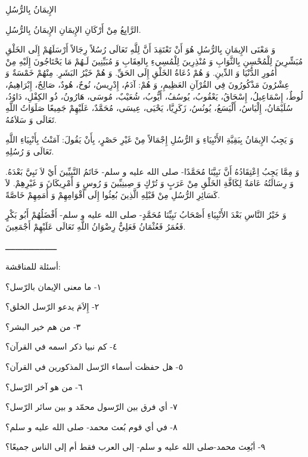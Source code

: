 \documentclass[a5paper]{article}
\begin{document}
الإِيمَانُ بِالرُّسُلِ

الرَّابِعُ مِنْ أَرْكَانِ الإِيمَانِ الإِيمَانُ بِالرُّسُلِ.

وَ مَعْنَى الإِيمَانِ بِالرُّسُلِ هُوَ أَنْ تَعْتَقِدَ أَنَّ لِلَّهِ تَعَالَى رُسُلاً رِجَالاً أَرْسَلَهُمْ إِلَى الخَلْقِ مُبَشِّرِينَ لِلْمُحْسِنِ بِالثَّوَابِ وَ مُنْذِرِينَ لِلْمُسِيءِ بِالعِقَابِ وَ مُبَيِّنِينَ لَـهُمْ مَا يَحْتَاجُونَ إِلَيْهِ مِنْ أُمُورِ الدُّنْيَا وَ الدِّينِ. وَ هُمْ دُعَاةُ الخَلْقِ إِلَى الحَقِّ. وَ هُمْ خَيْرُ البَشَرِ. مِنْهُمْ خَمْسَةٌ وَ عِشْرُونَ مَذْكُورُونَ فِي القُرْآنِ العَظِيمِ، وَ هُمْ: آدَمُ، إِدْرِيسُ، نُوحٌ، هُودٌ، صَالِحٌ، إِبْرَاهِيمُ، لُوطٌ، إِسْمَاعِيلُ، إِسْحَاقُ، يَعْقُوبُ، يُوسُفُ، أَيُّوبُ، شُعَيْبٌ، مُوسَى، هَارُونُ، ذُو الكِفْلِ، دَاوُدُ، سُلَيْمَانُ، إِلْيَاسُ، أَلْيَسَعُ، يُونُسُ، زَكَرِيَّا، يَحْيَى، عِيسَى، مُحَمَّدٌ، عَلَيْهِمْ جَمِيعًا صَلَوَاتُ اللَّهِ تَعَالَى وَ سَلاَمُهُ.

وَ يَجِبُ الإِيمَانُ بِبَقِيَّةِ الأَنْبِيَاءِ وَ الرُّسُلِ إِجْمَالاً مِنْ غَيْرِ حَصْرٍ، بِأَنْ يَقُولَ: آمَنْتُ بِأَنْبِيَاءِ اللَّهِ تَعَالَى وَ رُسُلِهِ.

وَ مِمَّا يَجِبُ اِعْتِقَادُهُ أَنَّ نَبِيَّنَا مُحَمَّدًا- صلى الله عليه و سلم- خَاتَمُ النَّبِيِّينَ أَيْ لاَ نَبِيَّ بَعْدَهُ. وَ رِسَالَتُهُ عَامَةٌ لِكَافَّةِ الخَلْقِ مِنْ عَرَبٍ وَ تُرْكٍ وَ صِينِيِّينَ وَ رُوسٍ وَ أَمْرِيكَانَ وَ غَيْرِهِمْ. لاَ كَسَائِرِ الرُّسُلِ مِنْ قَبْلِهِ الَّذِينَ بُعِثُوا إِلَى أَقْوَامِهِمْ وَ أُمَمِهِمْ خَاصَّةً.

وَ خَيْرُ النَّاسِ بَعْدَ الأَنْبِيَاءِ أَصْحَابُ نَبِيِّنَا مُحَمَّدٍ- صلى الله عليه و سلم- أَفْضَلُهُمْ أَبُو بَكْرٍ فَعُمَرُ فَعُثْمَانُ فَعَلِيٌّ رِضْوَانُ اللَّهِ تَعَالَى عَلَيْهِمْ أَجْمَعِينَ.

ـــــــــــــــــــــ

أسئلة للمناقشة:

١- ما معنى الإيمان بالرّسل؟

٢- إِلاَمَ يدعو الرّسل الخلق؟

٣- من هم خير البشر؟

٤- كم نبيا ذكر اسمه في القرآن؟

٥- هل حفظت أسماء الرّسل المذكورين في القرآن؟

٦- من هو آخر الرّسل؟

٧- أي فرق بين الرّسول محمّد و بين سائر الرّسل؟

٨- في أي قوم بُعث محمد- صلى الله عليه و سلم؟

٩- أبُعِث محمد-صلى الله عليه و سلم- إلى العرب فقط أم إلى الناس جميعًا؟
\end{document}
